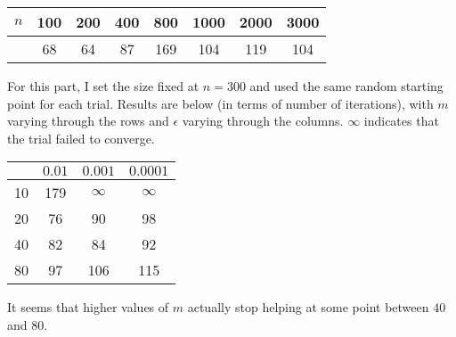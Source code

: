 \documentclass{article}
\newcommand{\ep}{\epsilon}
\begin{document}
\begin{tabular}{c|c|c|c|c|c|c|c}
    $n$&100&200&400&800&1000&2000&3000\\
    \hline
       &68&64&87&169&104&119&104\\
\end{tabular}

For this part, I set the size fixed at $n=300$ and used the same random starting point for each trial. Results are below (in terms of number of iterations), with $m$ varying through the rows and $\ep$ varying through the columns. $\infty$ indicates that the trial failed to converge.

\begin{tabular}{c|c|c|c}
    &$0.01$&$0.001$&$0.0001$\\
    \hline
    10&179&$\infty$&$\infty$\\
    20&76&90&98\\
    40&82&84&92\\
    80&97&106&115\\
\end{tabular}

It seems that higher values of $m$ actually stop helping at some point between $40$ and $80$.
\end{document}
